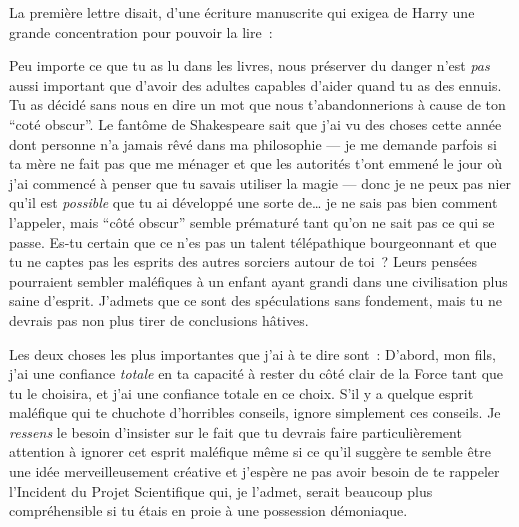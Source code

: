 La première lettre disait, d'une écriture manuscrite qui exigea de Harry une grande concentration pour pouvoir la lire~:
\begin{writtenNote}

Peu importe ce que tu as lu dans les livres, nous préserver du danger n'est \emph{pas} aussi important que d'avoir des adultes capables d'aider quand tu as des ennuis. Tu as décidé sans nous en dire un mot que nous t'abandonnerions à cause de ton “coté obscur”. Le fantôme de Shakespeare sait que j'ai vu des choses cette année dont personne n'a jamais rêvé dans ma philosophie — je me demande parfois si ta mère ne fait pas que me ménager et que les autorités t'ont emmené le jour où j'ai commencé à penser que tu savais utiliser la magie — donc je ne peux pas nier qu'il est \emph{possible} que tu ai développé une sorte de… je ne sais pas bien comment l'appeler, mais “côté obscur” semble prématuré tant qu'on ne sait pas ce qui se passe. Es-tu certain que ce n'es pas un talent télépathique bourgeonnant et que tu ne captes pas les esprits des autres sorciers autour de toi~? Leurs pensées pourraient sembler maléfiques à un enfant ayant grandi dans une civilisation plus saine d'esprit. J'admets que ce sont des spéculations sans fondement, mais tu ne devrais pas non plus tirer de conclusions hâtives.

Les deux choses les plus importantes que j'ai à te dire sont~: D'abord, mon fils, j'ai une confiance \emph{totale} en ta capacité à rester du côté clair de la Force tant que tu le choisira, et j'ai une confiance totale en ce choix. S'il y a quelque esprit maléfique qui te chuchote d'horribles conseils, ignore simplement ces conseils. Je \emph{ressens} le besoin d'insister sur le fait que tu devrais faire particulièrement attention à ignorer cet esprit maléfique même si ce qu'il suggère te semble être une idée merveilleusement créative et j'espère ne pas avoir besoin de te rappeler l'Incident du Projet Scientifique qui, je l'admet, serait beaucoup plus compréhensible si tu étais en proie à une possession démoniaque.


\end{writtenNote}
